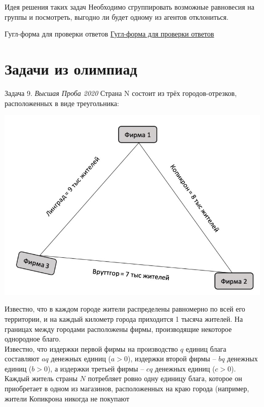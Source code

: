\begin{mybox}{Идея решения таких задач}
    \indent\setlength{\parindent}{1em}\indent\setlength{\parindent}{1em}Необходимо сгруппировать возможные равновесия на группы и посмотреть, выгодно ли будет одному из агентов
    отклониться.
\end{mybox}

\begin{mybox}{Гугл-форма для проверки ответов}
    \href{https://forms.gle/1FkPGARXqSBnACzs8}{Гугл-форма для проверки ответов}
\end{mybox}

\section{Задачи из олимпиад}

\begin{mybox}{Задача 9. \textit{Высшая Проба 2020}}
    \indent\setlength{\parindent}{1em}\indent\setlength{\parindent}{1em}Страна N состоит из трёх городов-отрезков,
    расположенных в виде треугольника:
    \begin{center}
        \includegraphics[width=0.5\linewidth]{static/4_9}
    \end{center}
    \indent\setlength{\parindent}{1em}\indent\setlength{\parindent}{1em}Известно, что в каждом городе жители
    распределены равномерно по всей его территории, и на каждый километр города приходится 1 тысяча жителей. На
    границах между городами расположены фирмы, производящие некоторое однородное благо.\\
    \indent\setlength{\parindent}{1em}Известно, что издержки первой фирмы на производство $q$ единиц блага составляют
    $aq$ денежных единиц ($a>0$), издержки второй фирмы – $bq$ денежных единиц ($b>0$), а издержки третьей фирмы – $cq$
    денежных единиц ($c>0$).\\
    \indent\setlength{\parindent}{1em}Каждый житель страны $N$ потребляет ровно одну единицу блага, которое он
    приобретает в одном из магазинов, расположенных на краю города (например, жители Копикрона никогда не покупают

\end{mybox}
